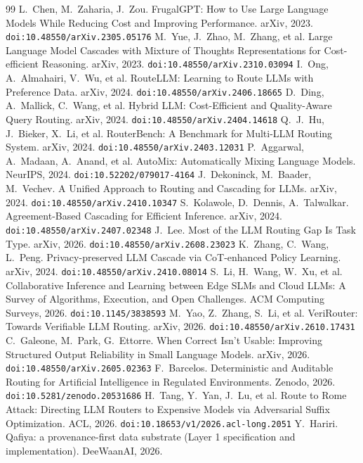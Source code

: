 \documentclass[11pt]{article}
\begin{document}
\begin{thebibliography}{99}
 L.~Chen, M.~Zaharia, J.~Zou. FrugalGPT: How to Use Large Language Models While Reducing Cost and Improving Performance. arXiv, 2023. \texttt{doi:10.48550/arXiv.2305.05176}
 M.~Yue, J.~Zhao, M.~Zhang, et al. Large Language Model Cascades with Mixture of Thoughts Representations for Cost-efficient Reasoning. arXiv, 2023. \texttt{doi:10.48550/arXiv.2310.03094}
 I.~Ong, A.~Almahairi, V.~Wu, et al. RouteLLM: Learning to Route LLMs with Preference Data. arXiv, 2024. \texttt{doi:10.48550/arXiv.2406.18665}
 D.~Ding, A.~Mallick, C.~Wang, et al. Hybrid LLM: Cost-Efficient and Quality-Aware Query Routing. arXiv, 2024. \texttt{doi:10.48550/arXiv.2404.14618}
 Q.~J.~Hu, J.~Bieker, X.~Li, et al. RouterBench: A Benchmark for Multi-LLM Routing System. arXiv, 2024. \texttt{doi:10.48550/arXiv.2403.12031}
 P.~Aggarwal, A.~Madaan, A.~Anand, et al. AutoMix: Automatically Mixing Language Models. NeurIPS, 2024. \texttt{doi:10.52202/079017-4164}
 J.~Dekoninck, M.~Baader, M.~Vechev. A Unified Approach to Routing and Cascading for LLMs. arXiv, 2024. \texttt{doi:10.48550/arXiv.2410.10347}
 S.~Kolawole, D.~Dennis, A.~Talwalkar. Agreement-Based Cascading for Efficient Inference. arXiv, 2024. \texttt{doi:10.48550/arXiv.2407.02348}
 J.~Lee. Most of the LLM Routing Gap Is Task Type. arXiv, 2026. \texttt{doi:10.48550/arXiv.2608.23023}
 K.~Zhang, C.~Wang, L.~Peng. Privacy-preserved LLM Cascade via CoT-enhanced Policy Learning. arXiv, 2024. \texttt{doi:10.48550/arXiv.2410.08014}
 S.~Li, H.~Wang, W.~Xu, et al. Collaborative Inference and Learning between Edge SLMs and Cloud LLMs: A Survey of Algorithms, Execution, and Open Challenges. ACM Computing Surveys, 2026. \texttt{doi:10.1145/3838593}
 M.~Yao, Z.~Zhang, S.~Li, et al. VeriRouter: Towards Verifiable LLM Routing. arXiv, 2026. \texttt{doi:10.48550/arXiv.2610.17431}
 C.~Galeone, M.~Park, G.~Ettorre. When Correct Isn't Usable: Improving Structured Output Reliability in Small Language Models. arXiv, 2026. \texttt{doi:10.48550/arXiv.2605.02363}
 F.~Barcelos. Deterministic and Auditable Routing for Artificial Intelligence in Regulated Environments. Zenodo, 2026. \texttt{doi:10.5281/zenodo.20531686}
 H.~Tang, Y.~Yan, J.~Lu, et al. Route to Rome Attack: Directing LLM Routers to Expensive Models via Adversarial Suffix Optimization. ACL, 2026. \texttt{doi:10.18653/v1/2026.acl-long.2051}
 Y.~Hariri. Qafiya: a provenance-first data substrate (Layer 1 specification and implementation). DeeWaanAI, 2026.
\end{thebibliography}
\end{document}
